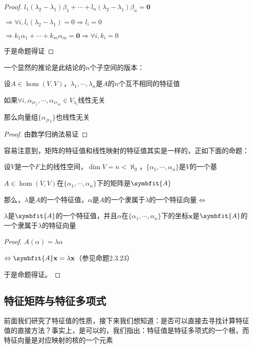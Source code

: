 \documentclass[12pt, a4paper, oneside, UTF8]{ctexbook}
\begin{document}
\begin{para}{0}
\begin{proof}
						$l_1(\lambda_2-\lambda_1)\beta_1+\cdots+l_n(\lambda_2-\lambda_1)\beta_n=\mathbf{0}$

						$\Rightarrow \forall i,l_i(\lambda_2-\lambda_1)=0 \Rightarrow l_i=0$

						$\Rightarrow k_1\alpha_1+\cdots+k_m\alpha_m=\mathbf{0} \Rightarrow \forall i, k_i =0$

						于是命题得证
					\end{proof}
					一个显然的推论是此结论的$n$个子空间的版本：
					\begin{corollary}{}
						设$A \in \hom(V,V)$，$\lambda_1,\cdots,\lambda_n$是$A$的$n$个互不相同的特征值

						如果$\forall i,\alpha_{ir_1},\cdots,\alpha_{ir_m} \in V_{\lambda_i}$线性无关

						那么向量组$\{\alpha_{jr_k}\}$也线性无关
					\end{corollary}
					\begin{proof}
						由数学归纳法易证
					\end{proof}
				\point{}
					
					容易注意到，矩阵的特征值和线性映射的特征值其实是一样的，正如下面的命题：
					\begin{proposition}
						设$V$是一个$F$上的线性空间，$\dim V = n < \aleph_0$，$\{\alpha_1,\cdots,\alpha_n\}$是$V$的一个基

						$A \in \hom(V,V)$在$\{\alpha_1,\cdots,\alpha_n\}$下的矩阵是$\symbfit{A}$

						那么，$\lambda $是$A$的一个特征值，$\alpha $是$A$的一个隶属于$\lambda $的一个特征向量$\Leftrightarrow$

						$\lambda $是$\symbfit{A}$的一个特征值，并且$\alpha $在$\{\alpha_1,\cdots,\alpha_n\}$下的坐标$\mathbf{x}$是$\symbfit{A}$的一个隶属于$\lambda $的特征向量
					\end{proposition}
					\begin{proof}
						$A(\alpha )=\lambda \alpha $

						$\Leftrightarrow \symbfit{A}\mathbf{x}=\lambda \mathbf{x}$（参见命题2.3.23）

						于是命题得证。
					\end{proof}
			\end{para}
		\subsection{特征矩阵与特征多项式}
			前面我们研究了特征值的性质，接下来我们想知道：是否可以直接去寻找计算特征值的直接方法？事实上，是可以的，我们指出：特征值是特征多项式的一个根，而特征向量是对应映射的核的一个元素
\end{document}
